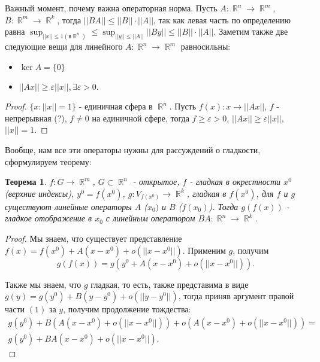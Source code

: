 \documentclass[a4paper,100pt]{article}
\theoremstyle{indented}
\newtheorem{theorem}{Теорема}
\theoremstyle{definition}
\theoremstyle{remark}
\DeclareMathOperator{\RR}{\mathbb{R}}
\begin{document}
Важный момент, почему важна операторная норма. Пусть $A:\RR^n\rightarrow \RR^m$, $B:\RR^m\rightarrow \RR^k$, тогда $||BA||\leq ||B||\cdot||A||$, так как левая часть по определению равна $\sup_{||x||\leq 1 (в \RR^n)}\leq \sup_{||y||\leq||A||}||By||\leq ||B||\cdot||A||$. Заметим также две следующие вещи для линейного $A:\RR^n\rightarrow \RR^m$ равносильны: \ 

\begin{itemize}
    \item $\ker A=\{0\}$
    \item $||Ax||\geq \varepsilon ||x||, \exists \varepsilon >0$. 
\end{itemize}

\begin{proof}
    $\{x:||x||=1\}$ - единичная сфера в $\RR^n$. Пусть $f(x):x\rightarrow ||Ax||$, $f$ - непрерывная (?), $f\neq 0$ на единичной сфере, тогда $f\geq \varepsilon >0$, $||Ax||\geq \varepsilon||x||$, $||x||=1$. 
\end{proof}

Вообще, нам все эти операторы нужны для рассуждений о гладкости, сформулируем теорему: \\ 

\begin{theorem}
    $f: G\rightarrow \RR^m$, $G\subset \RR^n$ - открытое, $f$ - гладкая в окрестности $x^0$ (верхние индексы), $y^0=f(x^0)$, $g:V_{f(x^0)}\rightarrow \RR^k$, гладкая в $f(x^0)$, для $f$ и $g$ существуют линейные операторы $A$ ($x_0)$ и $B$ ($f(x_0)$). Тогда $g(f(x))$ - гладкое отображение в $x_0$ с линейным оператором $BA:\RR^n\rightarrow \RR^k$. 
\end{theorem}

\begin{proof}
    Мы знаем, что существует представление $f(x)=f(x^0)+A(x-x^0)+o(||x-x^0||)$. Применим $g$, получим 
    \begin{equation}
        g(f(x))=g(y^0+A(x-x^0)+o(||x-x^0||)).
    \end{equation}
        
    Также мы знаем, что $g$ гладкая, то есть, также представима в виде $g(y)=g(y^0)+B(y-y^0)+o(||y-y^0||)$, тогда приняв аргумент правой части $(1)$ за $y$, получим продолжение тождества: 
    \begin{equation}
        \begin{split}
            g(y^0)+B(A(x-x^0)+o(||x-x^0||))+o(A(x-x^0)+o(||x-x^0||)) = \\ 
            g(y^0)+BA(x-x^0)+o(||x-x^0||).
        \end{split}
\end{equation}
\end{proof}
\end{document}
